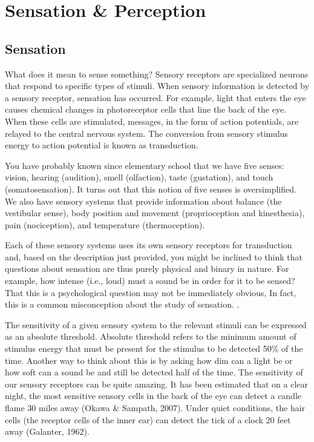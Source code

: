 \chapter{Sensation \& Perception}
\minitoc
\newpage


\section{Sensation}

What does it mean to sense something? Sensory receptors are specialized neurons that respond to specific types of stimuli. When sensory information is detected by a sensory receptor, sensation has occurred. For example, light that enters the eye causes chemical changes in photoreceptor cells that line the back of the eye. When these cells are stimulated, messages, in the form of action potentials, are relayed to the central nervous system. The conversion from sensory stimulus energy to action potential is known as \gls{transduction}.

You have probably known since elementary school that we have five senses: vision, hearing (audition), smell (olfaction), taste (gustation), and touch (somatosensation). It turns out that this notion of five senses is oversimplified. We also have sensory systems that provide information about balance (the vestibular sense), body position and movement (proprioception and kinesthesia), pain (nociception), and temperature (thermoception).

Each of these sensory systems uses its own sensory receptors for transduction and, based on the description just provided, you might be inclined to think that questions about sensation are thus purely physical and binary in nature.  For example, how intense (i.e., loud) must a sound be in order for it to be sensed? That this is a psychological question may not be immediately obvious, In fact, this is a common misconception about the study of sensation.   .

The sensitivity of a given sensory system to the relevant stimuli can be expressed as an absolute threshold. Absolute threshold refers to the minimum amount of stimulus energy that must be present for the stimulus to be detected 50\% of the time. Another way to think about this is by asking how dim can a light be or how soft can a sound be and still be detected half of the time. The sensitivity of our sensory receptors can be quite amazing. It has been estimated that on a clear night, the most sensitive sensory cells in the back of the eye can detect a candle flame 30 miles away (Okawa \& Sampath, 2007). Under quiet conditions, the hair cells (the receptor cells of the inner ear) can detect the tick of a clock 20 feet away (Galanter, 1962).

